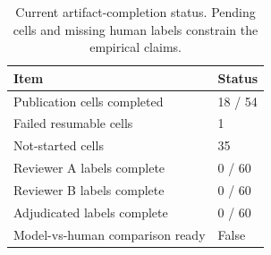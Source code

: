 
\begin{table}[t]
\centering
\caption{Current artifact-completion status. Pending cells and missing human labels constrain the empirical claims.}
\label{tab:artifact-status}
\begin{tabular}{ll}
\toprule
Item & Status \\
\midrule
Publication cells completed & 18 / 54 \\
Failed resumable cells & 1 \\
Not-started cells & 35 \\
Reviewer A labels complete & 0 / 60 \\
Reviewer B labels complete & 0 / 60 \\
Adjudicated labels complete & 0 / 60 \\
Model-vs-human comparison ready & False \\
\bottomrule
\end{tabular}
\end{table}
